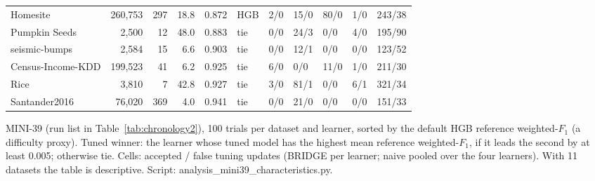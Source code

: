 \begin{table}[!t]
\begin{tabular}{@{}lrrrrllllll@{}}
Homesite & 260,753 & 297 & 18.8 & 0.872 & HGB & 2/0 & 15/0 & 80/0 & 1/0 & 243/38 \\
Pumpkin Seeds & 2,500 & 12 & 48.0 & 0.883 & tie & 0/0 & 24/3 & 0/0 & 4/0 & 195/90 \\
seismic-bumps & 2,584 & 15 & 6.6 & 0.903 & tie & 0/0 & 12/1 & 0/0 & 0/0 & 123/52 \\
Census-Income-KDD & 199,523 & 41 & 6.2 & 0.925 & tie & 6/0 & 0/0 & 11/0 & 1/0 & 211/30 \\
Rice & 3,810 & 7 & 42.8 & 0.927 & tie & 3/0 & 81/1 & 0/0 & 6/1 & 321/34 \\
Santander2016 & 76,020 & 369 & 4.0 & 0.941 & tie & 0/0 & 21/0 & 0/0 & 0/0 & 151/33 \\
\bottomrule
\end{tabular}

\vspace{2pt}
\parbox{\linewidth}{\justifying\scriptsize *MINI-39 (run list in Table~\ref{tab:chronology2}), 100 trials per dataset and learner, sorted by the default HGB reference weighted-$F_1$ (a difficulty proxy). Tuned winner: the learner whose tuned model has the highest mean reference weighted-$F_1$, if it leads the second by at least 0.005; otherwise tie. Cells: accepted / false tuning updates (BRIDGE per learner; naive pooled over the four learners). With 11 datasets the table is descriptive. Script: analysis\_mini39\_characteristics.py.}
\end{table}
